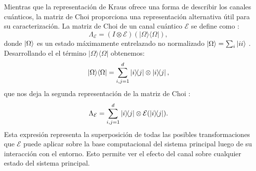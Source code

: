 \documentclass[letterpaper,12pt]{thesisECFM}
\theoremstyle{plain}
\theoremstyle{definition}
\theoremstyle{definition}
\theoremstyle{remark}
\newcommand{\1}{\mathbb{1}}
\begin{document}
Mientras que la representación de Kraus ofrece una forma de describir los canales cuánticos, la matriz de Choi proporciona una representación alternativa útil para su caracterización. 
La matriz de Choi de un canal cuántico $\mathcal{E}$ se define como \cite{QProcess}:
\begin{equation} 
\Lambda_{\mathcal{E}} = (I \otimes \mathcal{E})(|\Omega\rangle\langle\Omega|),
\end{equation} 
donde $\ket{\Omega}$ es un estado máximamente entrelazado no normalizado $\ket{\Omega} = \sum_i \ket{ii}$ .
Desarrollando el el término $|\Omega\rangle\langle\Omega|$ obtenemos:
\begin{equation}
|\Omega\rangle\langle\Omega| = \sum_{i,j=1}^{d} \ketbra{i}{j} \otimes \ketbra{i}{j},
\end{equation} 
que nos deja la segunda representación de la matriz de Choi
\cite{Qiskit_documentation} \cite{QProcess}:
\begin{equation}\label{ec:Choi_ketbra}
\Lambda_{\mathcal{E}} = \sum_{i,j=1}^{d} \ketbra{i}{j} \otimes \mathcal{E}(\ketbra{i}{j}).
\end{equation}
Esta expresión representa la superposición de todas las posibles transformaciones que $\mathcal{E}$ puede aplicar sobre la base computacional del sistema principal luego de su interacción con el entorno. Esto permite ver el efecto del canal sobre cualquier estado del sistema principal.
\end{document}
